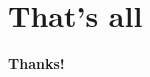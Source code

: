 


  
 

 \maketitle
 
 \begin{frame}
 \begin{multicols}{2} %
\tableofcontents
\end{multicols}
 \end{frame}


\section{That's all} %
\begin{frame}
\label{sec:that_s_all}
  \centering\Huge \textbf {Thanks!}
	
\end{frame}




